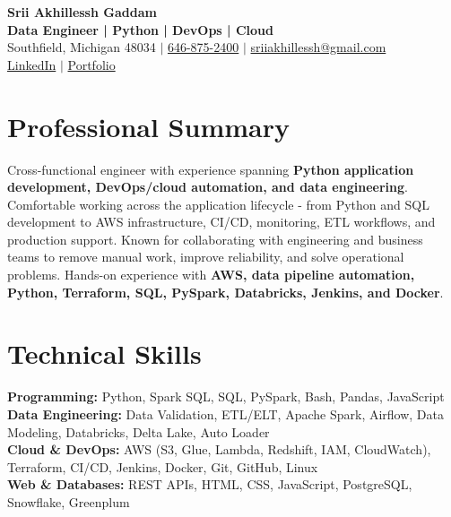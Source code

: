 \documentclass[letterpaper,10pt]{article}
\begin{document}
\fontsize{9.35pt}{10.45pt}\selectfont

\begin{center}
    {\LARGE \textbf{Srii Akhillessh Gaddam}} \\[-1pt]
    \textbf{Data Engineer | Python | DevOps | Cloud} \\[2pt]
    Southfield, Michigan 48034 $|$
    \href{tel:6468752400}{646-875-2400} $|$
    \href{mailto:sriiakhillessh@gmail.com}{sriiakhillessh@gmail.com} \\[1pt]
    \href{https://www.linkedin.com/in/srii-akhiilessh-gaddam-b48668191/}{LinkedIn} $|$
    \href{https://sriiakhillesshg.github.io/portfolio/}{Portfolio}
\end{center}
\vspace{-8pt}

\section{Professional Summary}
\small{Cross-functional engineer with experience spanning \textbf{Python application development, DevOps/cloud automation, and data engineering}. Comfortable working across the application lifecycle - from Python and SQL development to AWS infrastructure, CI/CD, monitoring, ETL workflows, and production support. Known for collaborating with engineering and business teams to remove manual work, improve reliability, and solve operational problems. Hands-on experience with \textbf{AWS, data pipeline automation, Python, Terraform, SQL, PySpark, Databricks, Jenkins, and Docker}.}

\section{Technical Skills}
\small{
\textbf{Programming:} Python, Spark SQL, SQL, PySpark, Bash, Pandas, JavaScript \\
\textbf{Data Engineering:} Data Validation, ETL/ELT, Apache Spark, Airflow, Data Modeling, Databricks, Delta Lake, Auto Loader \\
\textbf{Cloud \& DevOps:} AWS (S3, Glue, Lambda, Redshift, IAM, CloudWatch), Terraform, CI/CD, Jenkins, Docker, Git, GitHub, Linux \\
\textbf{Web \& Databases:} REST APIs, HTML, CSS, JavaScript, PostgreSQL, Snowflake, Greenplum
}

\end{document}
